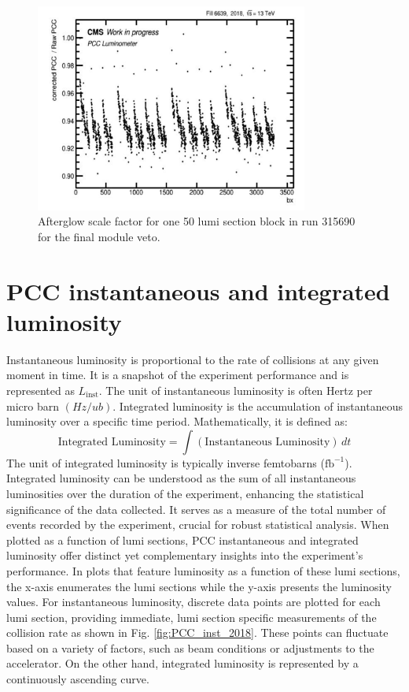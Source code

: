 \begin{figure}[H]
\centering
\includegraphics[width=0.8\textwidth]{ashish_thesis/afterglow_correction_factor_1lsblock_315690_3.png}
\caption[Run 315690 afterglow scale factor]{%
  Afterglow scale factor for one 50 lumi section block in run 315690 for the final module veto.
}
\label{fig:af_change_veto}
\end{figure}


\section{PCC instantaneous and integrated luminosity}

Instantaneous luminosity is proportional to the rate of collisions at any given moment in time. It is a snapshot of the experiment performance and is represented as \( L_{\text{inst}} \). The unit of instantaneous luminosity is often Hertz per micro barn $(Hz/ub)$. Integrated luminosity is the accumulation of instantaneous luminosity over a specific time period. Mathematically, it is defined as:
\[
\text{Integrated Luminosity} = \int (\text{Instantaneous Luminosity}) \, dt
\]
The unit of integrated luminosity is typically inverse femtobarns (\( \text{fb}^{-1} \)). Integrated luminosity can be understood as the sum of all instantaneous luminosities over the duration of the experiment, enhancing the statistical significance of the data collected. It serves as a measure of the total number of events recorded by the experiment, crucial for robust statistical analysis. When plotted as a function of lumi sections, PCC instantaneous and integrated luminosity offer distinct yet complementary insights into the experiment's performance. In plots that feature luminosity as a function of these lumi sections, the x-axis enumerates the lumi sections while the y-axis presents the luminosity values.  For instantaneous luminosity, discrete data points are plotted for each lumi section, providing immediate, lumi section specific measurements of the collision rate as shown in Fig. \ref{fig:PCC_inst_2018}. These points can fluctuate based on a variety of factors, such as beam conditions or adjustments to the accelerator. On the other hand, integrated luminosity is represented by a continuously ascending curve. %


